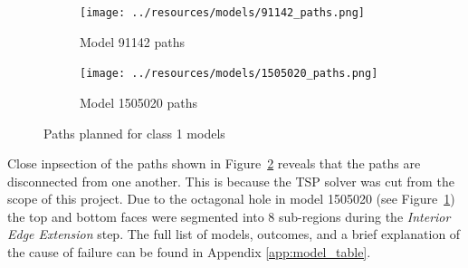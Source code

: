 \begin{figure}[htb]
	\centering
	\begin{subfigure}{0.4\textwidth}
		\texttt{[image: ../resources/models/91142\_paths.png]}
		\caption{Model 91142 paths}
	\end{subfigure}
	\hfill
	\begin{subfigure}{0.4\textwidth}
		\texttt{[image: ../resources/models/1505020\_paths.png]}
		\caption{Model 1505020 paths}
		\label{sfig:1505020_paths}
	\end{subfigure}
	\caption{Paths planned for class 1 models}
	\label{fig:class_1_results}
\end{figure}

Close inpsection of the paths shown in Figure~\ref{fig:class_1_results} reveals that the paths are disconnected from one another.
This is because the TSP solver was cut from the scope of this project.
Due to the octagonal hole in model 1505020 (see Figure~\ref{sfig:1505020_paths}) the top and bottom faces were segmented into 8 sub-regions during the \textit{Interior Edge Extension} step.
The full list of models, outcomes, and a brief explanation of the cause of failure can be found in Appendix \ref{app:model_table}.

